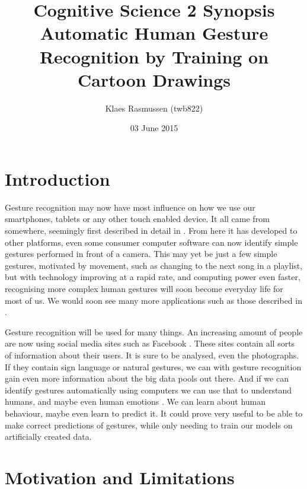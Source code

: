 \documentclass[11pt,a4paper]{article}
\begin{document}
\title{Cognitive Science 2 Synopsis \\ Automatic Human Gesture Recognition by Training on Cartoon Drawings}
\author{Klaes Rasmussen (twb822)}
\date{03 June 2015}
\maketitle
\pagebreak

\tableofcontents

\pagebreak

\section{Introduction}
\label{sec:introduction}

Gesture recognition may now have most influence on how we use our smartphones, tablets or any other touch enabled device. It all came from somewhere, seemingly first described in detail in \cite{Rubine}. From here it has developed to other platforms, even some consumer computer software can now identify simple gestures performed in front of a camera. This may yet be just a few simple gestures, motivated by movement, such as changing to the next song in a playlist, but with technology improving at a rapid rate, and computing power even faster, recognising more complex human gestures will soon become everyday life for most of us. We would soon see many more applications such as those described in \cite{Wachs}.

\vspace{0.5pc}

Gesture recognition will be used for many things. An increasing amount of people are now using social media sites such as Facebook \linebreak \cite{pew}. These sites contain all sorts of information about their users. It is sure to be analysed, even the photographs. If they contain sign language or natural gestures, we can with gesture recognition gain even more information about the big data pools out there. And if we can identify gestures automatically using computers we can use that to understand humans, and maybe even human emotions \cite{kipp}. We can learn about human behaviour, maybe even learn to predict it. It could prove very useful to be able to make correct predictions of gestures, while only needing to train our models on artificially created data.

\section{Motivation and Limitations}
\label{sec:motivation}
\end{document}
